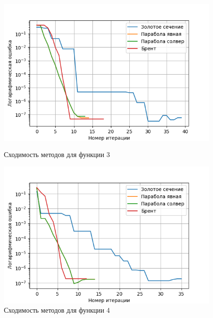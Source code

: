 \documentclass[a4paper,12pt]{article}
\begin{document}
\begin{figure}[H]
    \begin{minipage}{0.49\textwidth}
        \centering \includegraphics[width=\textwidth]{images/task1/f3.png}
        \caption{Сходимость методов для функции 3}
    \end{minipage}\hfill
    \begin{minipage}{0.49\textwidth}
        \centering \includegraphics[width=\textwidth]{images/task1/f4.png}
        \caption{Сходимость методов для функции 4}
    \end{minipage}
\end{figure}
\end{document}
